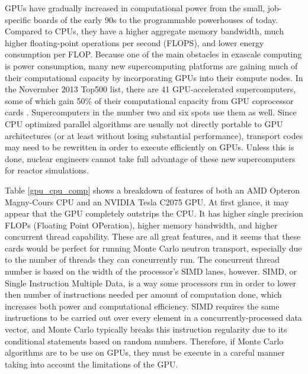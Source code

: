 GPUs have gradually increased in computational power from the small, job-specific boards of the early 90s to the programmable powerhouses of today.  Compared to CPUs, they have a higher aggregate memory bandwidth, much higher floating-point operations per second (FLOPS), and lower energy consumption per FLOP.  Because one of the main obstacles in exascale computing is power consumption, many new supercomputing platforms are gaining much of their computational capacity by incorporating GPUs into their compute nodes.  In the Novermber 2013 Top500 list, there are 41 GPU-accelerated supercomputers, some of which gain 50\% of their computational capacity from GPU coprocessor cards \cite{top500}.  Supercomputers in the number two and six spots use them as well.  Since CPU optimized parallel algorithms are usually not directly portable to GPU architectures (or at least without losing substantial performance), transport codes may need to be rewritten in order to execute efficiently on GPUs.  Unless this is done, nuclear engineers cannot take full advantage of these new supercomputers for reactor simulations.

Table \ref{gpu_cpu_comp} shows a breakdown of features of both an AMD Opteron Magny-Cours CPU and an NVIDIA Tesla C2075 GPU.  At first glance, it may appear that the GPU completely outstrips the CPU.  It has higher single precision FLOPs (Floating Point OPeration), higher memory bandwidth, and higher concurrent thread capability.  These are all great features, and it seems that these cards would be perfect for running Monte Carlo neutron transport, especially due to the number of threads they can concurrently run.  The concurrent thread number is based on the width of the processor's SIMD lanes, however.  SIMD, or Single Instruction Multiple Data, is a way some processors run in order to lower then number of instructions needed per amount of computation done, which increases both power and computational efficiency.  SIMD requires the same instructions to be carried out over every element  in a concurrently-processed data vector, and Monte Carlo typically breaks this instruction regularity due to its conditional statements based on random numbers.  Therefore, if Monte Carlo algorithms are to be use on GPUs, they must be execute in a careful manner taking into account the limitations of the GPU.

